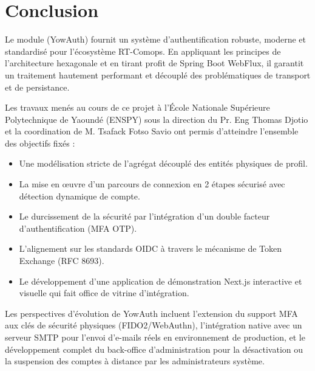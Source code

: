 \chapter{Conclusion}

Le module  (YowAuth) fournit un système d'authentification robuste, moderne et standardisé pour l'écosystème RT-Comops. En appliquant les principes de l'architecture hexagonale et en tirant profit de Spring Boot WebFlux, il garantit un traitement hautement performant et découplé des problématiques de transport et de persistance.

Les travaux menés au cours de ce projet à l'École Nationale Supérieure Polytechnique de Yaoundé (ENSPY) sous la direction du Pr. Eng Thomas Djotio et la coordination de M. Tsafack Fotso Savio ont permis d'atteindre l'ensemble des objectifs fixés :
\begin{itemize}
  \item Une modélisation stricte de l'agrégat  découplé des entités physiques de profil.
  \item La mise en œuvre d'un parcours de connexion en 2 étapes sécurisé avec détection dynamique de compte.
  \item Le durcissement de la sécurité par l'intégration d'un double facteur d'authentification (MFA OTP).
  \item L'alignement sur les standards OIDC à travers le mécanisme de Token Exchange (RFC 8693).
  \item Le développement d'une application de démonstration Next.js interactive et visuelle qui fait office de vitrine d'intégration.
\end{itemize}

Les perspectives d'évolution de YowAuth incluent l'extension du support MFA aux clés de sécurité physiques (FIDO2/WebAuthn), l'intégration native avec un serveur SMTP pour l'envoi d'e-mails réels en environnement de production, et le développement complet du back-office d'administration pour la désactivation ou la suspension des comptes à distance par les administrateurs système.
